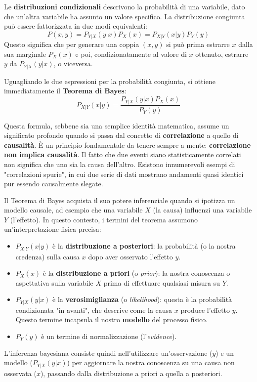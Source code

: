 Le \textbf{distribuzioni condizionali} descrivono la probabilità di una variabile, dato che un'altra variabile ha assunto un valore specifico. La distribuzione congiunta può essere fattorizzata in due modi equivalenti:
\begin{equation}
P(x,y) = P_{Y|X}(y|x) P_X(x) = P_{X|Y}(x|y) P_Y(y)
\end{equation}
Questo significa che per generare una coppia $(x,y)$ si può prima estrarre $x$ dalla sua marginale $P_X(x)$ e poi, condizionatamente al valore di $x$ ottenuto, estrarre $y$ da $P_{Y|X}(y|x)$, o viceversa.


Uguagliando le due espressioni per la probabilità congiunta, si ottiene immediatamente il \textbf{Teorema di Bayes}:
\begin{equation}
P_{X|Y}(x|y) = \frac{P_{Y|X}(y|x) P_X(x)}{P_Y(y)}
\end{equation}

Questa formula, sebbene sia una semplice identità matematica, assume un significato profondo quando si passa dal concetto di \textbf{correlazione} a quello di \textbf{causalità}. È un principio fondamentale da tenere sempre a mente: \textbf{correlazione non implica causalità}. Il fatto che due eventi siano statisticamente correlati non significa che uno sia la causa dell'altro. Esistono innumerevoli esempi di "correlazioni spurie", in cui due serie di dati mostrano andamenti quasi identici pur essendo causalmente slegate.

Il Teorema di Bayes acquista il suo potere inferenziale quando si ipotizza un modello causale, ad esempio che una variabile $X$ (la causa) influenzi una variabile $Y$ (l'effetto). In questo contesto, i termini del teorema assumono un'interpretazione fisica precisa:
\begin{itemize}
    \item $P_{X|Y}(x|y)$ è la \textbf{distribuzione a posteriori}: la probabilità (o la nostra credenza) sulla causa $x$ dopo aver osservato l'effetto $y$.
    \item $P_X(x)$ è la \textbf{distribuzione a priori} (o \textit{prior}): la nostra conoscenza o aspettativa sulla variabile $X$ prima di effettuare qualsiasi misura su $Y$.
    \item $P_{Y|X}(y|x)$ è la \textbf{verosimiglianza} (o \textit{likelihood}): questa è la probabilità condizionata "in avanti", che descrive come la causa $x$ produce l'effetto $y$. Questo termine incapsula il nostro \textbf{modello} del processo fisico.
    \item $P_Y(y)$ è un termine di normalizzazione (l'\textit{evidence}).
\end{itemize}
L'inferenza bayesiana consiste quindi nell'utilizzare un'osservazione ($y$) e un modello ($P_{Y|X}(y|x)$) per aggiornare la nostra conoscenza su una causa non osservata ($x$), passando dalla distribuzione a priori a quella a posteriori.



